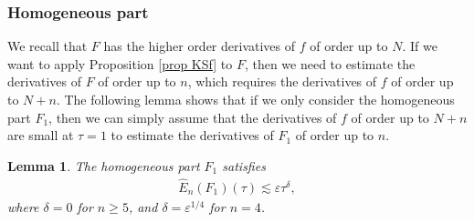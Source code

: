 \documentclass{article}
\newtheorem{lemma}{Lemma}[section]
\begin{document}
%
\subsubsection{Homogeneous part}
We recall that $ F $ has the higher order derivatives of $ f $ of order up to $ N $. If we want to apply Proposition \ref{prop KSf} to $ F $, then we need to estimate the derivatives of $ F $ of order up to $ n $, which requires the derivatives of $ f $ of order up to $ N + n $. The following lemma shows that if we only consider the homogeneous part $ F_1 $, then we can simply assume that the derivatives of $ f $ of order up to $ N + n $ are small at $ \tau = 1 $ to estimate the derivatives of $ F_1 $ of order up to $ n $.


%
\begin{lemma} \label{lem homo}
The homogeneous part $ F_1 $ satisfies
\begin{align}
\hat{ E }_n ( F_1 ) ( \tau ) \lesssim \varepsilon \tau^\delta , \label{homo}
\end{align}
where $ \delta = 0 $ for $ n \geq 5 $, and $ \delta = \varepsilon^{ 1 / 4 } $ for $ n = 4 $.
\end{lemma}
\end{document}
